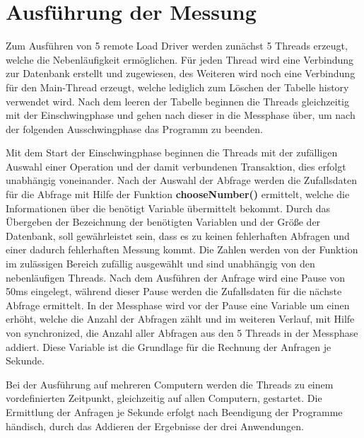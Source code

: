 \section{Ausführung der Messung}

Zum Ausführen von 5 remote Load Driver werden zunächst 5 Threads erzeugt, welche die Nebenläufigkeit 
ermöglichen. Für jeden Thread wird eine Verbindung zur Datenbank erstellt und zugewiesen, des 
Weiteren wird noch eine Verbindung für den Main-Thread erzeugt, welche lediglich zum Löschen der 
Tabelle history verwendet wird. Nach dem leeren der Tabelle beginnen die Threads gleichzeitig mit 
der Einschwingphase und gehen nach dieser in die Messphase über, um nach der folgenden 
Ausschwingphase das Programm zu beenden.

Mit dem Start der Einschwingphase beginnen die Threads mit der zufälligen Auswahl einer Operation 
und der damit verbundenen Transaktion, dies erfolgt unabhängig voneinander. Nach der Auswahl der 
Abfrage werden die Zufallsdaten für die Abfrage mit Hilfe der Funktion
\textbf{chooseNumber()} ermittelt, welche die Informationen über die benötigt
Variable übermittelt bekommt. Durch das Übergeben der Bezeichnung der benötigten Variablen und der Größe der Datenbank, soll gewährleistet sein, dass es 
zu keinen fehlerhaften Abfragen und einer dadurch fehlerhaften Messung kommt. Die Zahlen werden von 
der Funktion im zulässigen Bereich zufällig ausgewählt und sind unabhängig von den nebenläufigen 
Threads. Nach dem Ausführen der Anfrage wird eine Pause von 50ms eingelegt, während dieser Pause 
werden die Zufallsdaten für die nächste Abfrage ermittelt. In der Messphase wird vor der Pause eine 
Variable um einen erhöht, welche die Anzahl der Abfragen zählt und im weiteren Verlauf, mit Hilfe 
von synchronized, die Anzahl aller Abfragen aus den 5 Threads in der Messphase addiert. Diese 
Variable ist die Grundlage für die Rechnung der Anfragen je Sekunde.

Bei der Ausführung auf mehreren Computern werden die Threads zu einem vordefinierten Zeitpunkt, 
gleichzeitig auf allen Computern, gestartet. Die Ermittlung der Anfragen je Sekunde erfolgt nach 
Beendigung der Programme händisch, durch das Addieren der Ergebnisse der drei Anwendungen.


\clearpage